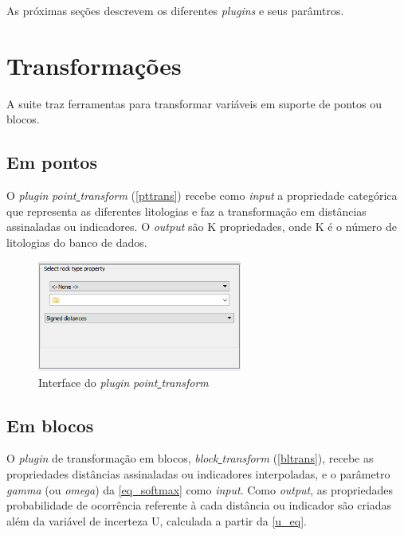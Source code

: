 As próximas seções descrevem os diferentes \textit{plugins} e seus parâmtros.

\section{Transformações}

A suite traz ferramentas para transformar variáveis em suporte de pontos ou blocos.

\subsection{Em pontos}\label{pttrans_sec}

O \textit{plugin} \textit{point\underline{ }transform} (\autoref{pttrans}) recebe como \textit{input} a propriedade categórica que representa as diferentes litologias e faz a transformação em distâncias assinaladas ou indicadores. O \textit{output} são K propriedades, onde K é o número de litologias do banco de dados.

\begin{figure}[H]
	\caption{\label{pttrans}Interface do \textit{plugin} \textit{point\underline{ }transform}}
	\centering
		\includegraphics[width=0.6\textwidth]{apendice/imagens/point_transform.PNG}
\end{figure}

\subsection{Em blocos}

O \textit{plugin} de transformação em blocos, \textit{block\underline{ }transform} (\autoref{bltrans}), recebe as propriedades distâncias assinaladas ou indicadores interpoladas, e o parâmetro \textit{gamma} (ou \textit{omega}) da \autoref{eq_softmax} como \textit{input}. Como \textit{output}, as propriedades probabilidade de ocorrência referente à cada distância ou indicador são criadas além da variável de incerteza U, calculada a partir da \autoref{u_eq}.

